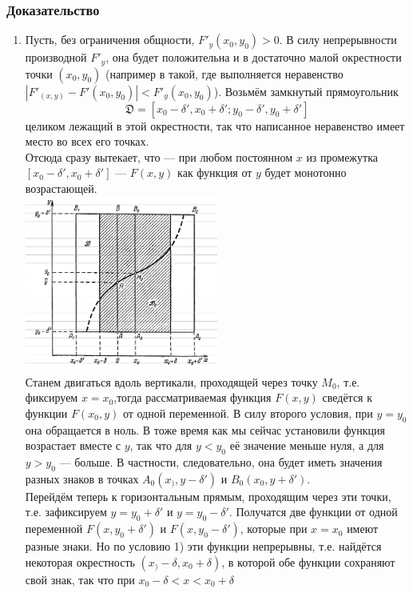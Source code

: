 \subsubsection*{Доказательство}

\begin{enumerate}
    \item Пусть, без ограничения общности, $F'_y(x_0, y_0) > 0$. В силу непрерывности 
    производной $F'_y$, она будет положительна и в достаточно малой окрестности точки 
    $(x_0, y_0)$ (например в такой, где выполняется неравенство 
    $|F'_(x,y) - F'(x_0, y_0)| < F'_y(x_0, y_0)$). Возьмём замкнутый прямоугольник
    \begin{equation*}
        \mathfrak{D} = [x_0 - \delta', x_0 + \delta'; y_0 - \delta', y_0 + \delta']
    \end{equation*}
    целиком лежащий в этой окрестности, так что написанное неравенство имеет место во всех
    его точках.\\
    Отсюда сразу вытекает, что --- при любом постоянном $x$ из промежутка $[x_0 - \delta', x_0 + \delta']$ --- $F(x, y)$ как функция от $y$ будет монотонно возрастающей.\\
    \includegraphics[width=2.5in]{30rect.png}\\
    Станем двигаться вдоль вертикали, проходящей через точку $M_0$, т.е. фиксируем $x = x_0$,тогда рассматриваемая функция $F(x, y)$ сведётся к функции $F(x_0, y)$ от одной переменной. В силу второго условия, при $y = y_0$ она обращается в ноль. В тоже время как мы сейчас установили функция возрастает вместе с $y$, так что для $y < y_0$ её значение меньше нуля, а для $y > y_0$ --- больше. В частности, следовательно, она будет иметь значения разных знаков в точках $A_0(x_), y - \delta')$ и $B_0(x_0, y + \delta')$.\\
    Перейдём теперь к горизонтальным прямым, проходящим через эти точки, т.е. зафиксируем $ y = y_0 + \delta'$ и $y = y_0 - \delta'$. Получатся две функции от одной переменной $F(x, y_0 + \delta')$ и $F(x, y_0 - \delta')$, которые при $x = x_0$ имеют разные знаки. Но по условию 1) эти функции непрерывны, т.е. найдётся некоторая окрестность $(x_) - \delta, x_0 + \delta)$, в которой обе функции сохраняют свой знак, так что при $x_0 -\delta < x < x_0 + \delta$

\end{enumerate}
